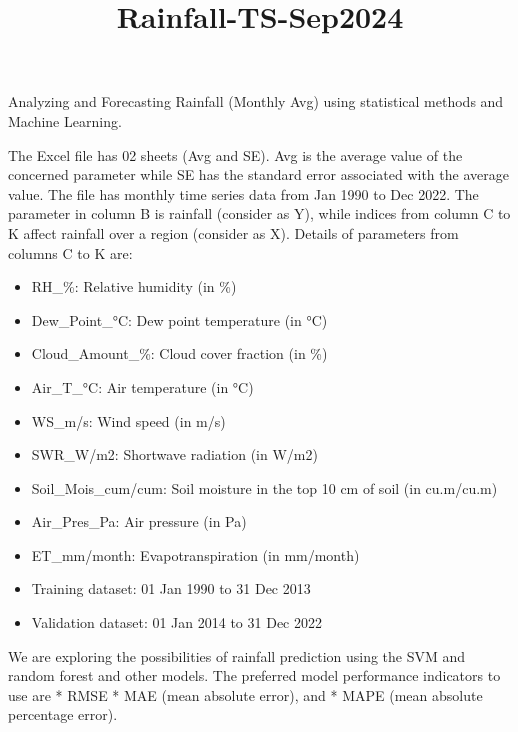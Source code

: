 \documentclass[11pt]{article}
\title{Rainfall-TS-Sep2024}
\begin{document}
    
    \maketitle
    
    

    
    Analyzing and Forecasting Rainfall (Monthly Avg) using statistical
methods and Machine Learning.

The Excel file has 02 sheets (Avg and SE). Avg is the average value of
the concerned parameter while SE has the standard error associated with
the average value. The file has monthly time series data from Jan 1990
to Dec 2022. The parameter in column B is rainfall (consider as Y),
while indices from column C to K affect rainfall over a region (consider
as X). Details of parameters from columns C to K are:

\begin{itemize}
\item
  RH\_\%: Relative humidity (in \%)
\item
  Dew\_Point\_°C: Dew point temperature (in °C)
\item
  Cloud\_Amount\_\%: Cloud cover fraction (in \%)
\item
  Air\_T\_°C: Air temperature (in °C)
\item
  WS\_m/s: Wind speed (in m/s)
\item
  SWR\_W/m2: Shortwave radiation (in W/m2)
\item
  Soil\_Mois\_cum/cum: Soil moisture in the top 10 cm of soil (in
  cu.m/cu.m)
\item
  Air\_Pres\_Pa: Air pressure (in Pa)
\item
  ET\_mm/month: Evapotranspiration (in mm/month)
\item
  Training dataset: 01 Jan 1990 to 31 Dec 2013
\item
  Validation dataset: 01 Jan 2014 to 31 Dec 2022
\end{itemize}

We are exploring the possibilities of rainfall prediction using the SVM
and random forest and other models. The preferred model performance
indicators to use are * RMSE * MAE (mean absolute error), and * MAPE
(mean absolute percentage error).
\end{document}
